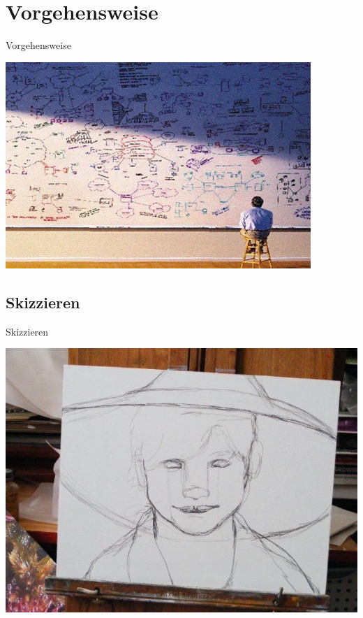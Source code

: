 \documentclass[19pt]{beamer}
\begin{document}
\section{Vorgehensweise}
\begin{frame}{Vorgehensweise}
\begin{center}
\includegraphics[scale=1]{resources/fing_hard.jpg}
\end{center}
\end{frame}
\subsection{Skizzieren}
\begin{frame}{Skizzieren}
\begin{center}
\includegraphics[scale=0.3]{resources/draft.jpg}
\end{center}
\end{frame}
\end{document}
